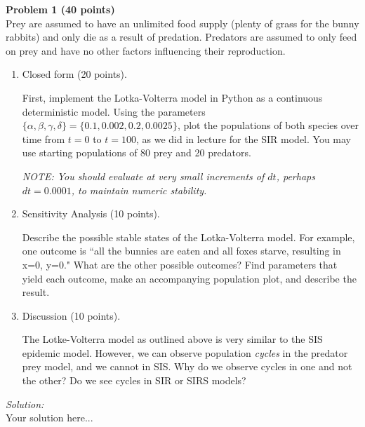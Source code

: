 \documentclass{article}
\newenvironment{problem}[2][Problem]
    { \begin{mdframed}[backgroundcolor=gray!20] \textbf{#1 #2} \\}
    {  \end{mdframed}}
\newenvironment{solution}
    {\noindent \textit{Solution:}\vspace{1em}\\}
    {\newpage}
\begin{document}
\begin{problem}{1 (40 points)}
Prey are assumed to have an unlimited food supply (plenty of grass for the bunny rabbits) and only die as a result of predation. Predators are assumed to only feed on prey and have no other factors influencing their reproduction.

\begin{enumerate}[label=(\alph*)]

    \item Closed form (20 points).

    First, implement the Lotka-Volterra model in Python as a continuous deterministic model. Using the parameters $\{\alpha,\beta,\gamma,\delta\} = \{0.1,0.002,0.2,0.0025\}$, plot the populations of both species over time from $t=0$ to $t=100$, as we did in lecture for the SIR model. You may use starting populations of 80 prey and 20 predators.

    \textit{NOTE: You should evaluate at very small increments of $dt$, perhaps $dt=0.0001$, to maintain numeric stability.}

    \item Sensitivity Analysis (10 points).

    Describe the possible stable states of the Lotka-Volterra model. For example, one outcome is ``all the bunnies are eaten and all foxes starve, resulting in x=0, y=0." What are the other possible outcomes? Find parameters that yield each outcome, make an accompanying population plot, and describe the result. 

    \item Discussion (10 points).

    The Lotke-Volterra model as outlined above is very similar to the SIS epidemic model. However, we can observe population \textit{cycles} in the predator prey model, and we cannot in SIS. Why do we observe cycles in one and not the other? Do we see cycles in SIR or SIRS models?

\end{enumerate}

\end{problem}

\begin{solution}
    Your solution here...
\end{solution}
\end{document}
